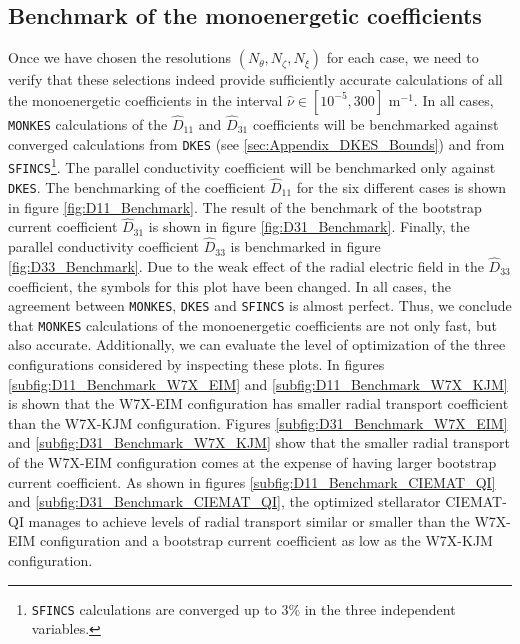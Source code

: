 \documentclass[10pt]{iopart}
\newcommand{\MONKES}{{\texttt{MONKES}}}
\newcommand{\DKES}{{\texttt{DKES}}}
\begin{document}
\FloatBarrier 

\subsection{Benchmark of the monoenergetic coefficients}\label{subsec:Benchmark}
Once we have chosen the resolutions $(N_\theta,N_\zeta,N_\xi)$ for each case, we need to verify that these selections indeed provide sufficiently accurate calculations of all the monoenergetic coefficients in the interval $\hat{\nu}\in[10^{-5},300]$ $\text{m}^{-1} $. In all cases, {\MONKES} calculations of the $\widehat{D}_{11}$ and $\widehat{D}_{31}$ coefficients will be benchmarked against converged calculations from {\DKES} (see \ref{sec:Appendix_DKES_Bounds}) and from \texttt{SFINCS}\footnote{\texttt{SFINCS} calculations are converged up to 3\% in the three independent variables.}. The parallel conductivity coefficient will be benchmarked only against {\DKES}. The benchmarking of the coefficient $\widehat{D}_{11}$ for the six different cases is shown in figure \ref{fig:D11_Benchmark}. The result of the benchmark of the bootstrap current coefficient $\widehat{D}_{31}$ is shown in figure \ref{fig:D31_Benchmark}. Finally, the parallel conductivity coefficient $\widehat{D}_{33}$ is benchmarked in figure \ref{fig:D33_Benchmark}. Due to the weak effect of the radial electric field in the $\widehat{D}_{33}$ coefficient, the symbols for this plot have been changed. In all cases, the agreement between {\MONKES}, {\DKES} and \texttt{SFINCS} is almost perfect. Thus, we conclude that {\MONKES} calculations of the monoenergetic coefficients are not only fast, but also accurate. Additionally, we can evaluate the level of optimization of the three configurations considered by inspecting these plots. In figures \ref{subfig:D11_Benchmark_W7X_EIM} and \ref{subfig:D11_Benchmark_W7X_KJM} is shown that the W7X-EIM configuration has smaller radial transport coefficient than the W7X-KJM configuration. Figures \ref{subfig:D31_Benchmark_W7X_EIM} and \ref{subfig:D31_Benchmark_W7X_KJM} show that the smaller radial transport of the W7X-EIM  configuration comes at the expense of having larger bootstrap current coefficient. As shown in figures \ref{subfig:D11_Benchmark_CIEMAT_QI} and \ref{subfig:D31_Benchmark_CIEMAT_QI}, the optimized stellarator CIEMAT-QI manages to achieve levels of radial transport similar or smaller than the W7X-EIM configuration and a bootstrap current coefficient as low as the W7X-KJM configuration.
%
\end{document}
